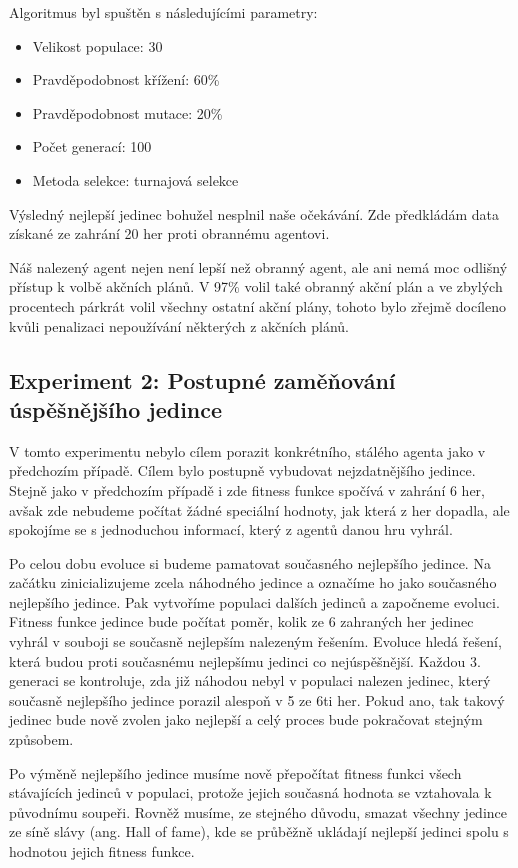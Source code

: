 Algoritmus byl spuštěn s následujícími parametry:
\begin{itemize}
    \item Velikost populace: 30
    \item Pravděpodobnost křížení: 60\%
    \item Pravděpodobnost mutace: 20\%
    \item Počet generací: 100
    \item Metoda selekce: turnajová selekce
\end{itemize}

Výsledný nejlepší jedinec bohužel nesplnil naše očekávání. Zde předkládám data získané ze zahrání 20 her proti obrannému agentovi.

Náš nalezený agent nejen není lepší než obranný agent, ale ani nemá moc odlišný přístup k volbě akčních plánů. 
V 97\% volil také obranný akční plán a ve zbylých procentech párkrát volil všechny ostatní akční plány, tohoto bylo zřejmě docíleno kvůli penalizaci nepoužívání některých z akčních plánů.






\subsection{Experiment 2: Postupné zaměňování úspěšnějšího jedince}
V tomto experimentu nebylo cílem porazit konkrétního, stálého agenta jako v předchozím případě.
Cílem bylo postupně vybudovat nejzdatnějšího jedince.
Stejně jako v předchozím případě i zde fitness funkce spočívá v zahrání 6 her,
avšak zde nebudeme počítat žádné speciální hodnoty, jak která z her dopadla, ale spokojíme se s jednoduchou informací, který z agentů danou hru vyhrál.
\par
Po celou dobu evoluce si budeme pamatovat současného nejlepšího jedince. 
Na začátku zinicializujeme zcela náhodného jedince a označíme ho jako současného nejlepšího jedince.
Pak vytvoříme populaci dalších jedinců a započneme evoluci.
Fitness funkce jedince bude počítat poměr, kolik ze 6 zahraných her jedinec vyhrál v souboji se současně nejlepším nalezeným řešením.
Evoluce hledá řešení, která budou proti současnému nejlepšímu jedinci co nejúspěšnější.
Každou 3. generaci se kontroluje, zda již náhodou nebyl v populaci nalezen jedinec, který současně nejlepšího jedince porazil alespoň v 5 ze 6ti her.
Pokud ano, tak takový jedinec bude nově zvolen jako nejlepší a celý proces bude pokračovat stejným způsobem.
\par
Po výměně nejlepšího jedince musíme nově přepočítat fitness funkci všech stávajících jedinců v populaci, protože jejich současná hodnota se vztahovala k původnímu soupeři.
Rovněž musíme, ze stejného důvodu, smazat všechny jedince ze síně slávy (ang. Hall of fame), kde se průběžně ukládají nejlepší jedinci spolu s hodnotou jejich fitness funkce.

